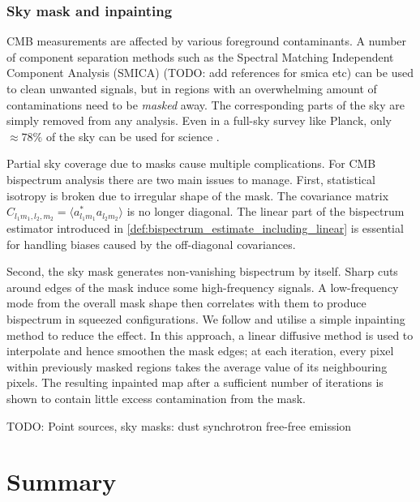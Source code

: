\subsubsection*{Sky mask and inpainting}

CMB measurements are affected by various foreground contaminants. A number of component separation methods such as the Spectral Matching Independent Component Analysis (SMICA) (TODO: add references for smica etc) can be used to clean unwanted signals, but in regions with an overwhelming amount of contaminations need to be \textit{masked} away. The corresponding parts of the sky are simply removed from any analysis. Even in a full-sky survey like Planck, only $\approx 78\%$ of the sky can be used for science \cite{PlanckCollaboration2018component}.

Partial sky coverage due to masks cause multiple complications. For CMB bispectrum analysis there are two main issues to manage. First, statistical isotropy is broken due to irregular shape of the mask. The covariance matrix $C_{l_1 m_1, l_2, m_2} = \langle a^*_{l_1 m_1} a_{l_2 m_2} \rangle$ is no longer diagonal. The linear part of the bispectrum estimator introduced in \eqref{def:bispectrum_estimate_including_linear} is essential for handling biases caused by the off-diagonal covariances.

Second, the sky mask generates non-vanishing bispectrum by itself. Sharp cuts around edges of the mask induce some high-frequency signals. A low-frequency mode from the overall mask shape then correlates with them to produce bispectrum in squeezed configurations. We follow \cite{Gruetjen2017inpainting} and utilise a simple inpainting method to reduce the effect. In this approach, a linear diffusive method is used to interpolate and hence smoothen the mask edges; at each iteration, every pixel within previously masked regions takes the average value of its neighbouring pixels. The resulting inpainted map after a sufficient number of iterations is shown to contain little excess contamination from the mask. 

TODO: Point sources, sky masks: dust synchrotron free-free emission


\section*{Summary}

